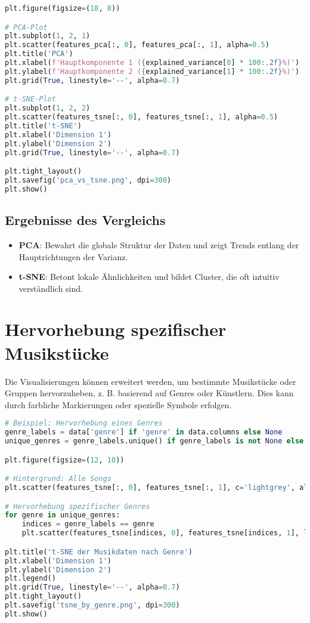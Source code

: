 \begin{lstlisting}[language=python, caption={Vergleich von PCA und t-SNE}]
plt.figure(figsize=(18, 8))

# PCA-Plot
plt.subplot(1, 2, 1)
plt.scatter(features_pca[:, 0], features_pca[:, 1], alpha=0.5)
plt.title('PCA')
plt.xlabel(f'Hauptkomponente 1 ({explained_variance[0] * 100:.2f}%)')
plt.ylabel(f'Hauptkomponente 2 ({explained_variance[1] * 100:.2f}%)')
plt.grid(True, linestyle='--', alpha=0.7)

# t-SNE-Plot
plt.subplot(1, 2, 2)
plt.scatter(features_tsne[:, 0], features_tsne[:, 1], alpha=0.5)
plt.title('t-SNE')
plt.xlabel('Dimension 1')
plt.ylabel('Dimension 2')
plt.grid(True, linestyle='--', alpha=0.7)

plt.tight_layout()
plt.savefig('pca_vs_tsne.png', dpi=300)
plt.show()
\end{lstlisting}

\subsection{Ergebnisse des Vergleichs}

\begin{itemize}
    \item \textbf{PCA}: Bewahrt die globale Struktur der Daten und zeigt Trends entlang der Hauptrichtungen der Varianz.
    \item \textbf{t-SNE}: Betont lokale Ähnlichkeiten und bildet Cluster, die oft intuitiv verständlich sind.
\end{itemize}

\section{Hervorhebung spezifischer Musikstücke}

Die Visualisierungen können erweitert werden, um bestimmte Musikstücke oder Gruppen hervorzuheben, z. B. basierend auf Genres oder Künstlern. Dies kann durch farbliche Markierungen oder spezielle Symbole erfolgen.

\begin{lstlisting}[language=python, caption={Hervorhebung spezifischer Musikstücke}]
# Beispiel: Hervorhebung eines Genres
genre_labels = data['genre'] if 'genre' in data.columns else None
unique_genres = genre_labels.unique() if genre_labels is not None else []

plt.figure(figsize=(12, 10))

# Hintergrund: Alle Songs
plt.scatter(features_tsne[:, 0], features_tsne[:, 1], c='lightgrey', alpha=0.3, label='Andere')

# Hervorhebung spezifischer Genres
for genre in unique_genres:
    indices = genre_labels == genre
    plt.scatter(features_tsne[indices, 0], features_tsne[indices, 1], label=genre, alpha=0.7)

plt.title('t-SNE der Musikdaten nach Genre')
plt.xlabel('Dimension 1')
plt.ylabel('Dimension 2')
plt.legend()
plt.grid(True, linestyle='--', alpha=0.7)
plt.tight_layout()
plt.savefig('tsne_by_genre.png', dpi=300)
plt.show()
\end{lstlisting}

